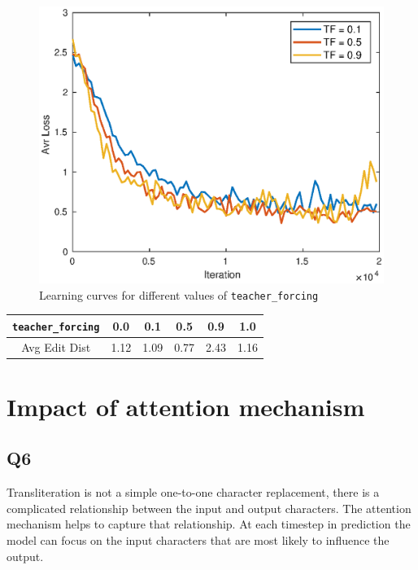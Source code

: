 \documentclass[12pt]{article}
\begin{document}
\begin{figure}[h]
    \centering
    \includegraphics[width=\linewidth]{img/teacher_forcing2.eps}
    \caption{Learning curves for different values of \texttt{teacher\_forcing}}
    \label{fig_teacher}
\end{figure}

\begin{center}
 \begin{tabular}{|c || c | c | c | c | c |} 
 \hline
 \texttt{teacher\_forcing} & 0.0 & 0.1 & 0.5 & 0.9 & 1.0 \\ [0.5ex] 
 \hline
 Avg Edit Dist & 1.12 & 1.09 & 0.77 & 2.43 & 1.16 \\ 
 \hline
\end{tabular}
\end{center}


\section{Impact of attention mechanism}

\subsection{Q6}

Transliteration is not a simple one-to-one character replacement, there is a complicated relationship between the input and output characters. The attention mechanism helps to capture that relationship. At each timestep in prediction the model can focus on the input characters that are most likely to influence the output.
\end{document}
